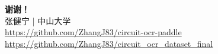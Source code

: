 \documentclass[10pt,aspectratio=169,table]{beamer}
\begin{document}
\begin{frame}[plain]
  \begin{center}
    \Huge\textcolor{sysublue}{\textbf{谢谢！}}\\[1cm]
    \Large 张健宁 \; | \; 中山大学 \\[1cm]
    \normalsize
    \url{https://github.com/ZhangJ83/circuit-ocr-paddle} \\[0.3cm]
    \url{https://github.com/ZhangJ83/circuit_ocr_dataset_final}
  \end{center}
\end{frame}
\end{document}
